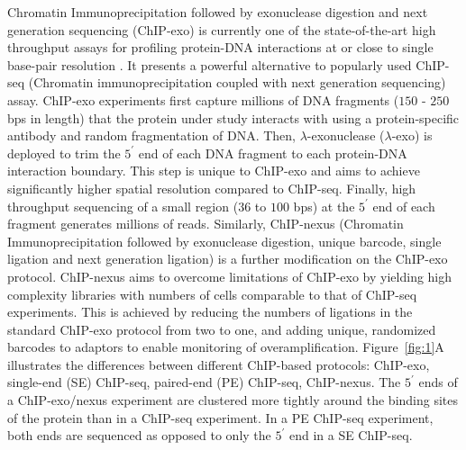 \documentclass{bmcart}
\newcommand{\RW}[1]{\textcolor{blue}{RW: #1}}
\begin{document}
Chromatin Immunoprecipitation followed by exonuclease digestion and
next generation sequencing (ChIP-exo) is currently one of the
state-of-the-art high throughput assays for profiling protein-DNA
interactions at or close to single base-pair resolution
\cite{exo1}. It presents a powerful alternative to popularly used
ChIP-seq (Chromatin immunoprecipitation coupled with next generation
sequencing) assay. ChIP-exo experiments first capture millions of DNA
fragments ($150$ - $250$ bps in length) that the protein under study
interacts with using a protein-specific antibody and random
fragmentation of DNA. Then, $\lambda$-exonuclease ($\lambda$-exo) is
deployed to trim the $5^{\prime}$ end of each DNA fragment to each
protein-DNA interaction boundary. This step is unique to ChIP-exo and
aims to achieve significantly higher spatial resolution compared to
ChIP-seq. Finally, high throughput sequencing of a small region ($36$
to $100$ bps) at the $5^{\prime}$ end of each fragment generates
millions of reads.  Similarly, ChIP-nexus (Chromatin
Immunoprecipitation followed by exonuclease digestion, unique barcode,
single ligation and next generation ligation) \cite{chipnexus} is a
further modification on the ChIP-exo protocol. ChIP-nexus aims to
overcome limitations of ChIP-exo by yielding high complexity libraries
with numbers of cells comparable to that of ChIP-seq experiments. This
is achieved by reducing the numbers of ligations in the standard
ChIP-exo protocol from two to one, and adding unique, randomized
barcodes to adaptors to enable monitoring of
overamplification. Figure~\ref{fig:1}A illustrates the differences between
different ChIP-based protocols: ChIP-exo, single-end (SE) ChIP-seq,
paired-end (PE) ChIP-seq, ChIP-nexus. The $5^{\prime}$ ends of a
ChIP-exo/nexus experiment are clustered more tightly around the
binding sites of the protein than in a ChIP-seq experiment. In a PE
ChIP-seq experiment, both ends are sequenced as opposed to only the
$5^{\prime}$ end in a SE ChIP-seq.

\end{document}
